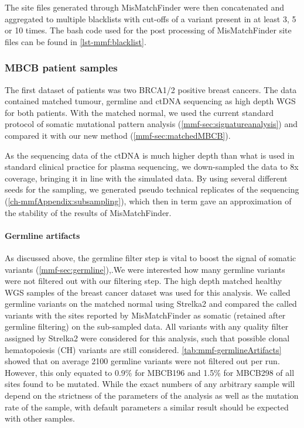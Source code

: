 The site files generated through MisMatchFinder were then concatenated and aggregated to multiple blacklists with cut-offs of a variant present in at least 3, 5 or 10 times. The bash code used for the post processing of MisMatchFinder site files can be found in \autoref{lst-mmf:blacklist}.




\subsubsection{MBCB patient samples}
\label{mmf-sec:brcapatients}
The first dataset of patients was two BRCA1/2 positive breast cancers. The data contained matched tumour, germline and ctDNA sequencing as high depth WGS for both patients. With the matched normal, we used the current standard protocol of somatic mutational pattern analysis (\autoref{mmf-sec:signatureanalysis}) and compared it with our new method (\autoref{mmf-sec:matchedMBCB}). 

As the sequencing data of the ctDNA is much higher depth than what is used in standard clinical practice for plasma sequencing, we down-sampled the data to 8x coverage, bringing it in line with the simulated data. By using several different seeds for the sampling, we generated pseudo technical replicates of the sequencing (\autoref{ch-mmfAppendix:subsampling}), which then in term gave an approximation of the stability of the results of MisMatchFinder.




\paragraph{Germline artifacts}
\label{mmf-sec:germlineArtifacts}
As discussed above, the germline filter step is vital to boost the signal of somatic variants (\autoref{mmf-sec:germline}),.We were interested how many germline variants were not filtered out with our filtering step. The high depth matched healthy WGS samples of the breast cancer dataset was used for this analysis. We called germline variants on the matched normal using Strelka2 and compared the called variants with the sites reported by MisMatchFinder as somatic (retained after germline filtering) on the sub-sampled data. All variants with any quality filter assigned by Strelka2 were considered for this analysis, such that possible clonal hematopoiesis (CH) variants are still considered. \autoref{tab:mmf-germlineArtifacts} showed that on average 2100 germline variants were not filtered out per run. However, this only equated to 0.9\% for MBCB196 and 1.5\% for MBCB298 of all sites found to be mutated. While the exact numbers of any arbitrary sample will depend on the strictness of the parameters of the analysis as well as the mutation rate of the sample, with default parameters a similar result should be expected with other samples.

